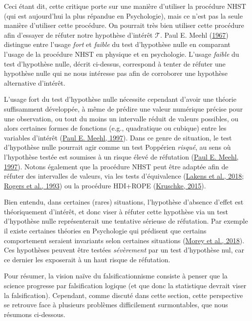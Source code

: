 \documentclass[
  a4paper,11pt,twoside,onecolumn,openright,final,oldfontcommands]{memoir}
\theoremstyle{definition}
\theoremstyle{definition}
\theoremstyle{definition}
\theoremstyle{definition}
\theoremstyle{remark}
\begin{document}
Ceci étant dit, cette critique porte sur une manière d'utiliser la procédure NHST (qui est aujourd'hui la plus répandue en Psychologie), mais ce n'est pas la seule manière d'utiliser cette procédure. On pourrait très bien utiliser cette procédure afin d'essayer de réfuter notre hypothèse d'intérêt \(\mathcal{T}\). Paul E. Meehl (\protect\hyperlink{ref-meehl_theory-testing_1967}{1967}) distingue entre l'usage \emph{fort} et \emph{faible} du test d'hypothèse nulle en comparant l'usage de la procédure NHST en physique et en psychologie. L'usage \emph{faible} du test d'hypothèse nulle, décrit ci-dessus, correspond à tenter de réfuter une hypothèse nulle qui ne nous intéresse pas afin de corroborer une hypothèse alternative d'intérêt.

L'usage fort du test d'hypothèse nulle nécessite cependant d'avoir une théorie suffisamment développée, à même de prédire une valeur numérique précise pour une observation, ou tout du moins un intervalle réduit de valeurs possibles, ou alors certaines formes de fonctions (e.g., quadratique ou cubique) entre les variables d'intérêt (\protect\hyperlink{ref-harlow_problem_1997}{Paul E. Meehl, 1997}). Dans ce genre de situation, le test d'hypothèse nulle pourrait agir comme un test Poppérien \emph{risqué}, au sens où l'hypothèse testée est soumises à un risque élevé de réfutation (\protect\hyperlink{ref-harlow_problem_1997}{Paul E. Meehl, 1997}). Notons également que la procédure NHST peut être adaptée afin de réfuter des intervalles de valeurs, via les tests d'équivalence (\protect\hyperlink{ref-lakens_equivalence_2018}{Lakens et al., 2018}; \protect\hyperlink{ref-rogers_using_1993}{Rogers et al., 1993}) ou la procédure HDI+ROPE (\protect\hyperlink{ref-kruschke_doing_2015}{Kruschke, 2015}).

Bien entendu, dans certaines (rares) situations, l'hypothèse d'absence d'effet est théoriquement d'intérêt, et donc viser à réfuter cette hypothèse via un test d'hypothèse nulle représenterait une tentative sérieuse de réfutation. Par exemple il existe certaines théories en Psychologie qui prédisent que certains comportement seraient invariants selon certaines situations (\protect\hyperlink{ref-morey_beyond_2018}{Morey et al., 2018}). Ces hypothèses peuvent être testées \emph{sévèrement} par un test d'hypothèse nul, car ce dernier les exposerait à un haut risque de réfutation.

Pour résumer, la vision naïve du falsificationnisme consiste à penser que la science progresse par falsification logique (et que donc la statistique devrait viser la falsification). Cependant, comme discuté dans cette section, cette perspective se retrouve face à plusieurs problèmes difficilement surmontables, que nous résumons ci-dessous.
\end{document}

